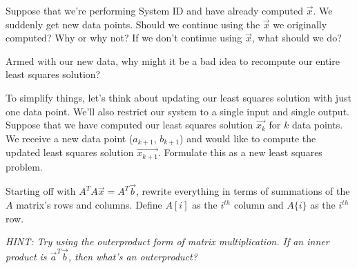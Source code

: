 \begin{enumerate}

\qitem
Suppose that we're performing System ID and have already computed $\vec{x}$. We suddenly get new data points. Should we continue using the $\vec{x}$ we originally computed? Why or why not? If we don't continue using $\vec{x}$, what should we do?


\qitem
Armed with our new data, why might it be a bad idea to recompute our entire least squares solution?


\qitem
To simplify things, let's think about updating our least squares solution with just one data point.
We'll also restrict our system to a single input and single output.
Suppose that we have computed our least squares solution $\vec{x_k}$ for $k$ data points.
We receive a new data point ($a_{k+1}$, $b_{k+1}$) and would like to compute the updated least squares solution $\vec{x_{k+1}}$.
Formulate this as a new least squares problem.


\qitem
Starting off with $A^{T}A\vec{x} = A^{T}\vec{b}$, rewrite everything in terms of summations of the $A$ matrix's rows and columns.
Define $A[i]$ as the $i^{th}$ column and $A\{i\}$ as the $i^{th}$ row.

\textit{HINT: Try using the outerproduct form of matrix multiplication. If an inner product is $\vec{a}^{T}\vec{b}$, then what's an outerproduct?}


\end{enumerate}
